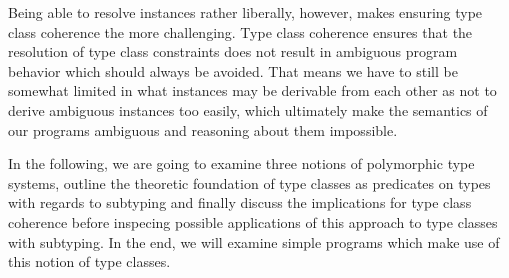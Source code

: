 Being able to resolve instances rather liberally, however, makes ensuring type class coherence the more challenging.
Type class coherence ensures that the resolution of type class constraints does not result in ambiguous program behavior which should always be avoided.
That means we have to still be somewhat limited in what instances may be derivable from each other as not to derive ambiguous instances too easily, which ultimately make the semantics of our programs ambiguous and reasoning about them impossible.

In the following, we are going to examine three notions of polymorphic type systems, outline the theoretic foundation of type classes as predicates on types with regards to subtyping and finally discuss the implications for type class coherence before inspecing possible applications of this approach to type classes with subtyping.
In the end, we will examine simple programs which make use of this notion of type classes.